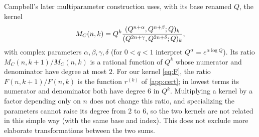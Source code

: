 Campbell's later multiparameter construction \cite[\S4.4, (32)]{Campbell2}
uses, with its base renamed $Q$, the kernel
\[
M_C(n,k)=Q^k\frac{(Q^{n+\alpha},Q^{n+\beta};Q)_{k}}{(Q^{2n+\gamma},Q^{2n+\delta};Q)_{k}},
\]
with complex parameters $\alpha,\beta,\gamma,\delta$ (for $0<q<1$ interpret
$Q^\alpha=e^{\alpha\log Q}$). Its ratio $M_C(n,k+1)/M_C(n,k)$ is a rational
function of $Q^k$ whose numerator and denominator have degree at most $2$. For
our kernel \eqref{eq:F}, the ratio $F(n,k+1)/F(n,k)$ is the function
$r^{(k)}$ of \cref{app:cert}; in lowest terms its numerator and denominator
both have degree $6$ in $Q^k$. Multiplying a kernel by a factor depending only
on $n$ does not change this ratio, and specializing the parameters cannot raise
its degree from $2$ to $6$, so the two kernels are not related in this simple way (with the same
base and index). This does not exclude more elaborate transformations
between the two sums.
